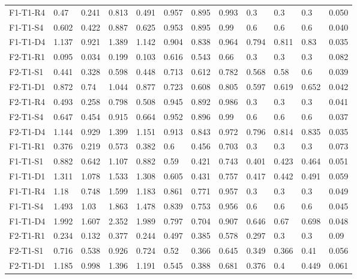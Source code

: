 \begin{table}[ht]
\begin{tabular}{llllllllllll}
     F1-T1-R4     & 0.47 & 0.241 & 0.813 & 0.491 & 0.957 & 0.895 & 0.993 & 0.3 & 0.3 & 0.3 &    0.050  \\ 
     F1-T1-S4     & 0.602 & 0.422 & 0.887 & 0.625 & 0.953 & 0.895 & 0.99 & 0.6 & 0.6 & 0.6 &    0.040  \\ 
     F1-T1-D4     & 1.137 & 0.921 & 1.389 & 1.142 & 0.904 & 0.838 & 0.964 & 0.794 & 0.811 & 0.83 &    0.035  \\ 
     F2-T1-R1     & 0.095 & 0.034 & 0.199 & 0.103 & 0.616 & 0.543 & 0.66 & 0.3 & 0.3 & 0.3 &    0.082  \\ 
     F2-T1-S1     & 0.441 & 0.328 & 0.598 & 0.448 & 0.713 & 0.612 & 0.782 & 0.568 & 0.58 & 0.6 &    0.039  \\ 
     F2-T1-D1     & 0.872 & 0.74 & 1.044 & 0.877 & 0.723 & 0.608 & 0.805 & 0.597 & 0.619 & 0.652 &    0.042  \\ 
     F2-T1-R4     & 0.493 & 0.258 & 0.798 & 0.508 & 0.945 & 0.892 & 0.986 & 0.3 & 0.3 & 0.3 &    0.041  \\ 
     F2-T1-S4     & 0.647 & 0.454 & 0.915 & 0.664 & 0.952 & 0.896 & 0.99 & 0.6 & 0.6 & 0.6 &    0.037  \\ 
     F2-T1-D4     & 1.144 & 0.929 & 1.399 & 1.151 & 0.913 & 0.843 & 0.972 & 0.796 & 0.814 & 0.835 &    0.035  \\ 
     F1-T1-R1     & 0.376 & 0.219 & 0.573 & 0.382 & 0.6 & 0.456 & 0.703 & 0.3 & 0.3 & 0.3 & 0.073 \\ 
     F1-T1-S1     & 0.882 & 0.642 & 1.107 & 0.882 & 0.59 & 0.421 & 0.743 & 0.401 & 0.423 & 0.464 & 0.051 \\ 
     F1-T1-D1     & 1.311 & 1.078 & 1.533 & 1.308 & 0.605 & 0.431 & 0.757 & 0.417 & 0.442 & 0.491 & 0.059 \\ 
     F1-T1-R4     & 1.18 & 0.748 & 1.599 & 1.183 & 0.861 & 0.771 & 0.957 & 0.3 & 0.3 & 0.3 & 0.049 \\ 
     F1-T1-S4     & 1.493 & 1.03 & 1.863 & 1.478 & 0.839 & 0.753 & 0.956 & 0.6 & 0.6 & 0.6 & 0.045 \\ 
     F1-T1-D4     & 1.992 & 1.607 & 2.352 & 1.989 & 0.797 & 0.704 & 0.907 & 0.646 & 0.67 & 0.698 & 0.048 \\ 
     F2-T1-R1     & 0.234 & 0.132 & 0.377 & 0.244 & 0.497 & 0.385 & 0.578 & 0.297 & 0.3 & 0.3 & 0.09 \\ 
     F2-T1-S1     & 0.716 & 0.538 & 0.926 & 0.724 & 0.52 & 0.366 & 0.645 & 0.349 & 0.366 & 0.41 & 0.056 \\ 
     F2-T1-D1     & 1.185 & 0.998 & 1.396 & 1.191 & 0.545 & 0.388 & 0.681 & 0.376 & 0.4 & 0.449 & 0.061 \\ 

\end{tabular}
\end{table}
